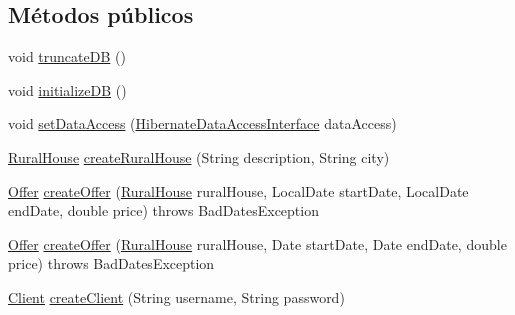 \subsection*{Métodos públicos}
\begin{DoxyCompactItemize}
\item 
void \mbox{\hyperlink{interfacecom_1_1ruralhousejsf_1_1business_logic_1_1_application_facade_interface_aeb85aa3c5dd08bc15e08cc0d4c36882e}{truncate\+DB}} ()
\item 
void \mbox{\hyperlink{interfacecom_1_1ruralhousejsf_1_1business_logic_1_1_application_facade_interface_a4670319006cee17060e0c84695d7195f}{initialize\+DB}} ()
\item 
void \mbox{\hyperlink{interfacecom_1_1ruralhousejsf_1_1business_logic_1_1_application_facade_interface_a8bb95aa007a4d95b32ed838ae40406c0}{set\+Data\+Access}} (\mbox{\hyperlink{interfacecom_1_1ruralhousejsf_1_1data_access_1_1_hibernate_data_access_interface}{Hibernate\+Data\+Access\+Interface}} data\+Access)
\item 
\mbox{\hyperlink{classcom_1_1ruralhousejsf_1_1domain_1_1_rural_house}{Rural\+House}} \mbox{\hyperlink{interfacecom_1_1ruralhousejsf_1_1business_logic_1_1_application_facade_interface_a7fc244cf74494e50a01148496d1b45ad}{create\+Rural\+House}} (String description, String city)
\item 
\mbox{\hyperlink{classcom_1_1ruralhousejsf_1_1domain_1_1_offer}{Offer}} \mbox{\hyperlink{interfacecom_1_1ruralhousejsf_1_1business_logic_1_1_application_facade_interface_a5a056a1b07c8ee83c1d540812b0a880d}{create\+Offer}} (\mbox{\hyperlink{classcom_1_1ruralhousejsf_1_1domain_1_1_rural_house}{Rural\+House}} rural\+House, Local\+Date start\+Date, Local\+Date end\+Date, double price)  throws Bad\+Dates\+Exception
\item 
\mbox{\hyperlink{classcom_1_1ruralhousejsf_1_1domain_1_1_offer}{Offer}} \mbox{\hyperlink{interfacecom_1_1ruralhousejsf_1_1business_logic_1_1_application_facade_interface_afaa6b314fb684fe1121f062481f2bcd9}{create\+Offer}} (\mbox{\hyperlink{classcom_1_1ruralhousejsf_1_1domain_1_1_rural_house}{Rural\+House}} rural\+House, Date start\+Date, Date end\+Date, double price)  throws Bad\+Dates\+Exception
\item 
\mbox{\hyperlink{classcom_1_1ruralhousejsf_1_1domain_1_1_client}{Client}} \mbox{\hyperlink{interfacecom_1_1ruralhousejsf_1_1business_logic_1_1_application_facade_interface_acb939a4c57b1136e2e8d1c7b661c10af}{create\+Client}} (String username, String password)
\item 

\end{DoxyCompactItemize}
